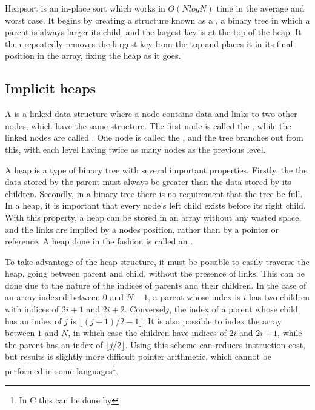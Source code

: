 \label{heap}

Heapsort is an in-place sort which works in $O(NlogN)$ time in the average and
worst case. It begins by creating a structure known as a , a binary tree
in which a parent is always larger its child, and the largest key is at the top
of the heap. It then repeatedly removes the largest key from the top and places
it in its final position in the array, fixing the heap as it goes.

\subsection{Implicit heaps}

A  is a linked data structure where a node contains data and links
to two other nodes, which have the same structure. The first node is called the
, while the linked nodes are called . One node is called the
, and the tree branches out from this, with each level having twice as many
nodes as the previous level.

A heap is a type of binary tree with several important properties. Firstly, the
the data stored by the parent must always be greater than the data stored by its
children. Secondly, in a binary tree there is no requirement that the tree be full.
In a heap, it is important that every node's left child exists before its right
child. With this property, a heap can be stored in an array without any wasted
space, and the links are implied by a nodes position, rather than by a pointer
or reference. A heap done in the fashion is called an .

To take advantage of the heap structure, it must be possible to easily traverse
the heap, going between parent and child, without the presence of links. This
can be done due to the nature of the indices of parents and their children. In
the case of an array indexed between $0$ and $N-1$, a parent whose index is
$i$ has two children with indices of $2i+1$ and $2i+2$. Conversely, the index of
a parent whose child has an index of $j$ is $\lfloor{}(j+1)/2-1\rfloor{}$. It is
also possible to index the array between $1$ and $N$, in which case the children
have indices of $2i$ and $2i+1$, while the parent has an index of
$\lfloor{}j/2\rfloor{}$. Using this scheme can reduces instruction cost, but
results is slightly more difficult pointer arithmetic, which cannot be performed
in some languages\footnote{In C this can be done by }.

